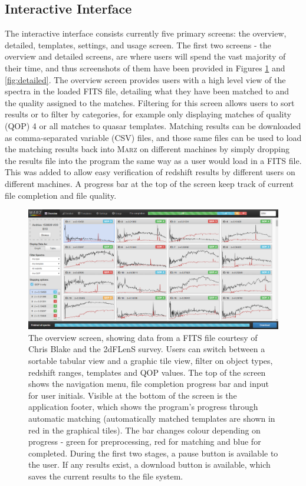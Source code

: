 \documentclass[5p]{elsarticle}
\newcommand{\marz}{\textsc{Marz}}
\begin{document}
\subsection{Interactive Interface}

The interactive interface consists currently five primary screens: the overview, detailed, templates, settings, and usage screen. The first two screens - the overview and detailed screens, are where users will spend the vast majority of their time, and thus screenshots of them have been provided in Figures \ref{fig:overview} and \ref{fig:detailed}. The overview screen provides users with a high level view of the spectra in the loaded FITS file, detailing what they have been matched to and the quality assigned to the matches. Filtering for this screen allows users to sort results or to filter by categories, for example only displaying matches of quality (QOP) 4 or all matches to quasar templates. Matching results can be downloaded as comma-separated variable (CSV) files, and those same files can be used to load the matching results back into \marz{} on different machines by simply dropping the results file into the program the same way as a user would load in a FITS file. This was added to allow easy verification of redshift results by different users on different machines. A progress bar at the top of the screen keep track of current file completion and file quality.\\



\begin{figure}[h]
\centering
\includegraphics[width=\textwidth]{InterfaceZ.png}
\caption{The overview screen, showing data from a FITS file courtesy of Chris Blake and the 2dFLenS survey. Users can switch between a sortable tabular view and a graphic tile view, filter on object types, redshift ranges, templates and QOP values. The top of the screen shows the navigation menu, file completion progress bar and input for user initials. Visible at the bottom of the screen is the application footer, which shows the program's progress through automatic matching (automatically matched templates are shown in red in the graphical tiles). The bar changes colour depending on progress - green for preprocessing, red for matching and blue for completed. During the first two stages, a pause button is available to the user. If any results exist, a download button is available, which saves the current results to the file system.}
\label{fig:overview}
\end{figure}
\end{document}
